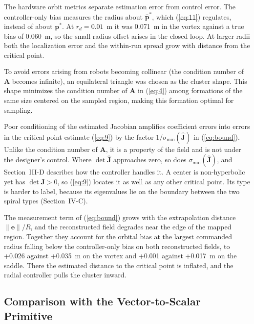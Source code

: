 \documentclass[lettersize,journal]{IEEEtran}
\newcommand{\rev}[1]{#1}
\begin{document}
The hardware orbit metrics separate estimation error from control error. The controller-only bias measures the radius about $\hat{\mathbf{p}}^*$, which (\ref{eq:11}) regulates, instead of about $\mathbf{p}^*$. At $r_d = 0.01$~m it was \rev{0.071}~m in the vortex against a true bias of \rev{0.060}~m, so the small-radius offset arises in the closed loop. At larger radii both the localization error and the within-run spread grow with distance from the critical point.

To avoid errors arising from robots becoming collinear (the condition number of $\mathbf{A}$ becomes infinite), an equilateral triangle was chosen as the cluster shape. This shape minimizes the condition number of $\mathbf{A}$ in (\ref{eq:4}) among formations of the same size centered on the sampled region, making this formation optimal for sampling.

Poor conditioning of the estimated Jacobian amplifies coefficient errors into errors in the critical point estimate (\ref{eq:9}) by the factor $1/\sigma_{\min}(\hat{\mathbf{J}})$ in (\ref{eq:bound}). Unlike the condition number of $\mathbf{A}$, it is a property of the field and is not under the designer's control. Where $\det\hat{\mathbf{J}}$ approaches zero, so does $\sigma_{\min}(\hat{\mathbf{J}})$, and Section~III-D describes how the controller handles it. A center is non-hyperbolic yet has $\det\mathbf{J} > 0$, so (\ref{eq:9}) locates it as well as any other critical point. Its type is harder to label, because its eigenvalues lie on the boundary between the two spiral types (Section~IV-C).

The measurement term of (\ref{eq:bound}) grows with the extrapolation distance $\|\mathbf{e}\|/R$, and the reconstructed field degrades near the edge of the mapped region. Together they account for the orbital bias at the largest commanded radius falling below the controller-only bias on both reconstructed fields, to \rev{+0.026} against \rev{+0.035}~m on the vortex and \rev{+0.001} against \rev{+0.017}~m on the saddle. There the estimated distance to the critical point is inflated, and the radial controller pulls the cluster inward.

\subsection{Comparison with the Vector-to-Scalar Primitive}
\end{document}
